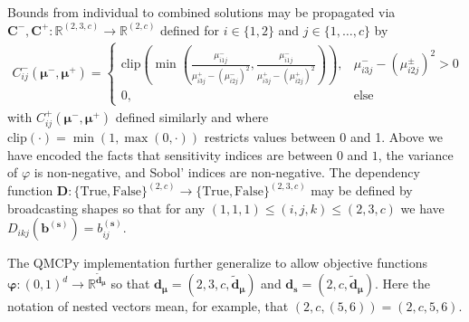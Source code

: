 \documentclass[graybox]{svmult}
\begin{document}
Bounds from individual to combined solutions may be propagated via $\boldsymbol{C}^-,\boldsymbol{C}^+:\mathbb{R}^{(2, 3, c)} \to \mathbb{R}^{(2, c)}$ defined for $i \in \{1,2\}$ and $j \in \{1,\dots,c\}$  by  
\begin{align*}
    C_{ij}^-(\boldsymbol{\mu}^-,\boldsymbol{\mu}^+) 
    = \begin{cases} 
        \text{clip}\left(\min\left(\frac{\mu_{i1j}^-}{\mu_{i3j}^+-\left(\mu_{i2j}^-\right)^2},\frac{\mu_{i1j}^-}{\mu_{i3j}^+-\left(\mu_{i2j}^+\right)^2}\right)\right), & \mu_{i3j}^- - \left(\mu_{i2j}^\pm\right)^2 >0 \\
        0, &\text{else}
     \end{cases} %
\end{align*}
with $C^+_{ij}(\boldsymbol{\mu}^-,\boldsymbol{\mu}^+)$ defined similarly and where $\text{clip}(\cdot) = \min(1,\max(0,\cdot))$ restricts values between 0 and 1. Above we have encoded the facts that sensitivity indices are between $0$ and $1$, the variance of $\varphi$ is non-negative, and Sobol' indices are non-negative. The dependency function $\boldsymbol{D}:\{\text{True},\text{False}\}^{(2, c)} \to \{\text{True},\text{False}\}^{(2, 3, c)}$ may be defined by broadcasting shapes so that for any $(1,1,1) \leq (i,j,k) \leq (2,3,c)$ we have $D_{ikj}(\boldsymbol{b}^{(\boldsymbol{s})}) = b_{ij}^{(\boldsymbol{s})}$. 

The QMCPy implementation further generalize to allow objective functions $\boldsymbol{\varphi}: (0,1)^{d} \to \mathbb{R}^{\tilde{\boldsymbol{d}}_{\boldsymbol{\mu}}}$ so that $\boldsymbol{d}_{\boldsymbol{\mu}} = (2,3,c,\tilde{\boldsymbol{d}}_{\boldsymbol{\mu}})$ and $\boldsymbol{d}_{\boldsymbol{s}} = (2,c,\tilde{\boldsymbol{d}}_{\boldsymbol{\mu}})$. Here the notation of nested vectors mean, for example, that  $(2,c,(5,6)) =(2,c,5,6)$.
\end{document}
